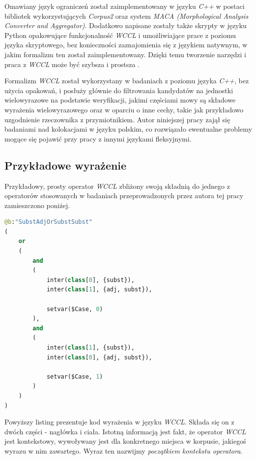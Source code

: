 \par
Omawiany język ograniczeń został zaimplementowany w języku \emph{C++} w postaci bibliotek wykorzystujących \emph{Corpus2} oraz system \emph{MACA (Morphological Analysis Converter and Aggregator)}. 
Dodatkowo napisane zostały także skrypty w języku Python opakowujące funkcjonalność \emph{WCCL} i umożliwiające prace z poziomu języka skryptowego, bez konieczności zaznajomienia się z językiem natywnym, w jakim formalizm ten został zaimplementowany. 
Dzięki temu tworzenie narzędzi i praca z \emph{WCCL} może być szybsza i prostsza \cite[str. 3]{wccl}.

\par
Formalizm \emph{WCCL} został wykorzystany w badaniach z poziomu języka \emph{C++}, bez użycia opakowań, i posłuży głównie do filtrowania kandydatów na jednostki wielowyrazowe na podstawie weryfikacji, jakimi częściami mowy są składowe wyrażenia wielowyrazowego oraz w oparciu o inne cechy, takie jak przykładowo uzgodnienie rzeczownika z przymiotnikiem.
Autor niniejszej pracy zajął się badaniami nad kolokacjami w języku polskim, co rozwiązało ewentualne problemy mogące się pojawić przy pracy z innymi językami fleksyjnymi.

\subsection{Przykładowe wyrażenie}
Przykładowy, prosty operator \emph{WCCL} zbliżony swoją składnią do jednego z operatorów stosowanych w badaniach przeprowadzonych przez autora tej pracy zamieszczono poniżej. 

\begin{lstlisting}[frame=single, tabsize=2, language=Python, caption=Przykładowe wyrażenie w języku \emph{WCCL}, captionpos=b, breaklines=true, basicstyle=\scriptsize]
@b:"SubstAdjOrSubstSubst"
(
	or
	(
		and
		(
			inter(class[0], {subst}),
			inter(class[1], {adj, subst}),
		
			setvar($Case, 0)
		),
		and
		(
			inter(class[1], {subst}),
			inter(class[0], {adj, subst}),
		
			setvar($Case, 1)
		)
	)
)
\end{lstlisting}

Powyższy listing prezentuje kod wyrażenia w języku \emph{WCCL}.
Składa się on z dwóch części - nagłówka i ciała.
Istotną informacją jest fakt, że operator \emph{WCCL} jest kontekstowy, wywoływany jest dla konkretnego miejsca w korpusie, jakiegoś wyrazu w nim zawartego.
Wyraz ten nazwijmy \emph{początkiem kontekstu operatora}.

